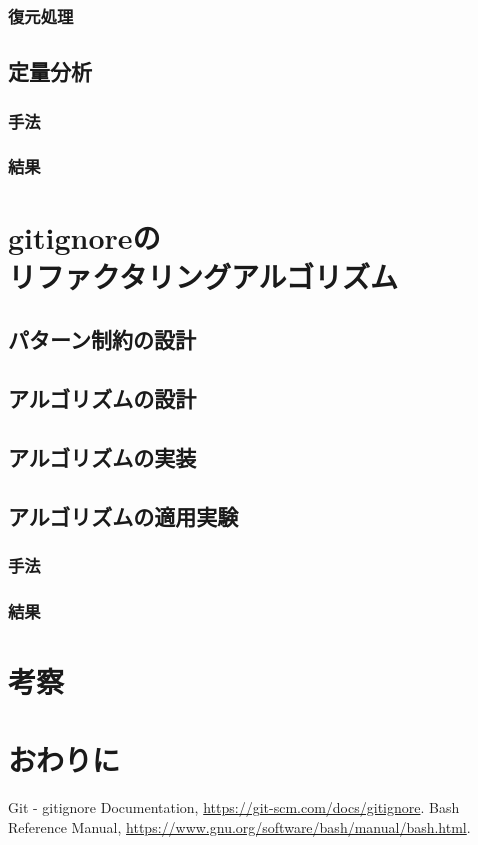 \documentclass[a4paper,xelatex,ja=standard,fontsize=11pt]{bxjsreport}
\begin{document}
\subsection{復元処理}

\section{定量分析}

\subsection{手法}

\subsection{結果}

%
\chapter[\textrm{gitignore}のリファクタリングアルゴリズム]{\textrm{gitignore}の\\リファクタリングアルゴリズム}

\section{パターン制約の設計}

\section{アルゴリズムの設計}

\section{アルゴリズムの実装}

\section{アルゴリズムの適用実験}

\subsection{手法}

\subsection{結果}

%
\chapter{考察}

%
\chapter{おわりに}

\backmatter

\begin{thebibliography}{}
	 Git - gitignore Documentation, \url{https://git-scm.com/docs/gitignore}.
	 Bash Reference Manual, \url{https://www.gnu.org/software/bash/manual/bash.html}.
\end{thebibliography}
\clearpage
\end{document}
